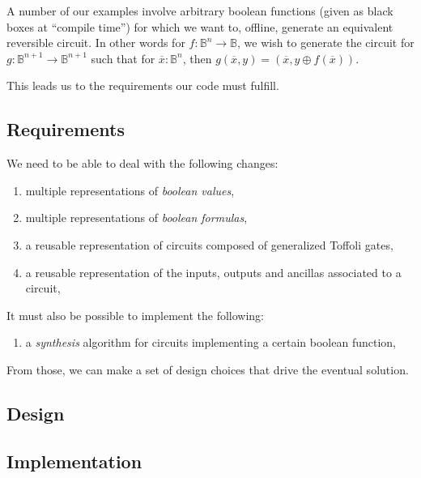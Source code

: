 \documentclass[sigplan]{acmart}
\newcommand{\Bool}{\ensuremath{\mathbb{B}}}
\begin{document}
A number of our examples involve arbitrary boolean functions (given as black
boxes at ``compile time'') for which we want to, offline, generate an
equivalent reversible circuit. In other words for $f : \Bool^n \rightarrow\Bool$,
we wish to generate the circuit for $g : \Bool^{n+1} \rightarrow \Bool^{n+1}$ such
that for $\overline{x} : \Bool^n$, then 
$g(\overline{x},y) = (\overline{x}, y \oplus f(\overline{x}))$.

This leads us to the requirements our code must fulfill.

\subsection{Requirements}

We need to be able to deal with the following changes:
\begin{enumerate}
  \item multiple representations of \emph{boolean values},
  \item multiple representations of \emph{boolean formulas},
  \item a reusable representation of circuits composed of generalized Toffoli gates,
  \item a reusable representation of the inputs, outputs and ancillas associated to
    a circuit,
\end{enumerate}

It must also be possible to implement the following:
\begin{enumerate}
  \item a \emph{synthesis} algorithm for circuits implementing a certain boolean
    function,
\end{enumerate}
From those, we can make a
set of design choices that drive the eventual solution.

\subsection{Design}

\subsection{Implementation}
\end{document}
